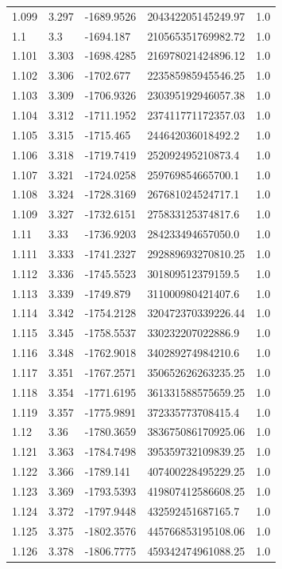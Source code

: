 \begin{tabular}{lllll}
1.099 & 3.297 & -1689.9526 & 204342205145249.97 & 1.0 \\
1.1 & 3.3 & -1694.187 & 210565351769982.72 & 1.0 \\
1.101 & 3.303 & -1698.4285 & 216978021424896.12 & 1.0 \\
1.102 & 3.306 & -1702.677 & 223585985945546.25 & 1.0 \\
1.103 & 3.309 & -1706.9326 & 230395192946057.38 & 1.0 \\
1.104 & 3.312 & -1711.1952 & 237411771172357.03 & 1.0 \\
1.105 & 3.315 & -1715.465 & 244642036018492.2 & 1.0 \\
1.106 & 3.318 & -1719.7419 & 252092495210873.4 & 1.0 \\
1.107 & 3.321 & -1724.0258 & 259769854665700.1 & 1.0 \\
1.108 & 3.324 & -1728.3169 & 267681024524717.1 & 1.0 \\
1.109 & 3.327 & -1732.6151 & 275833125374817.6 & 1.0 \\
1.11 & 3.33 & -1736.9203 & 284233494657050.0 & 1.0 \\
1.111 & 3.333 & -1741.2327 & 292889693270810.25 & 1.0 \\
1.112 & 3.336 & -1745.5523 & 301809512379159.5 & 1.0 \\
1.113 & 3.339 & -1749.879 & 311000980421407.6 & 1.0 \\
1.114 & 3.342 & -1754.2128 & 320472370339226.44 & 1.0 \\
1.115 & 3.345 & -1758.5537 & 330232207022886.9 & 1.0 \\
1.116 & 3.348 & -1762.9018 & 340289274984210.6 & 1.0 \\
1.117 & 3.351 & -1767.2571 & 350652626263235.25 & 1.0 \\
1.118 & 3.354 & -1771.6195 & 361331588575659.25 & 1.0 \\
1.119 & 3.357 & -1775.9891 & 372335773708415.4 & 1.0 \\
1.12 & 3.36 & -1780.3659 & 383675086170925.06 & 1.0 \\
1.121 & 3.363 & -1784.7498 & 395359732109839.25 & 1.0 \\
1.122 & 3.366 & -1789.141 & 407400228495229.25 & 1.0 \\
1.123 & 3.369 & -1793.5393 & 419807412586608.25 & 1.0 \\
1.124 & 3.372 & -1797.9448 & 432592451687165.7 & 1.0 \\
1.125 & 3.375 & -1802.3576 & 445766853195108.06 & 1.0 \\
1.126 & 3.378 & -1806.7775 & 459342474961088.25 & 1.0 \\

\end{tabular}
